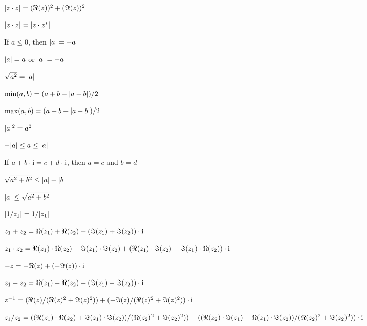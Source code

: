 \documentclass{article}
\begin{document}
\begin{thm}
\item\label{complex1:68} $\lvert z\cdot z\rvert=(\Re(z))^{2}+(\Im(z))^{2}$
\item\label{complex1:69} $\lvert z\cdot z\rvert=\lvert z\cdot z^{*}\rvert$
\item\label{complex1:70} If $a\leq0$, then $\lvert a\rvert=-a$
\item\label{complex1:71} $\lvert a\rvert=a$ or $\lvert a\rvert=-a$
\item\label{complex1:72} $\sqrt{a^{2}}=\lvert a\rvert$
\item\label{complex1:73} $\min(a,b)=(a+b-\lvert a-b\rvert)/2$
\item\label{complex1:74} $\max(a,b)=(a+b+\lvert a-b\rvert)/2$
\item\label{complex1:75} $\lvert a\rvert^{2}=a^{2}$
\item\label{complex1:76} $-\lvert a\rvert\leq a\leq\lvert a\rvert$
\item\label{complex1:77} If $a+b\cdot\mathrm{i}=c+d\cdot\mathrm{i}$, then $a=c$ and $b=d$
\item\label{complex1:78} $\sqrt{a^{2}+b^{2}}\leq\lvert a\rvert+\lvert b\rvert$
\item\label{complex1:79} $\lvert a\rvert\leq\sqrt{a^{2}+b^{2}}$
\item\label{complex1:80} $\lvert1/z_{1}\rvert=1/\lvert z_{1}\rvert$
\item\label{complex1:81} $z_{1}+z_{2}=\Re(z_{1})+\Re(z_{2})+(\Im(z_{1})+\Im(z_{2}))\cdot\mathrm{i}$
\item\label{complex1:82} $z_{1}\cdot z_{2}=\Re(z_{1})\cdot\Re(z_{2})-\Im(z_{1})\cdot\Im(z_{2})+(\Re(z_{1})\cdot\Im(z_{2})+\Im(z_{1})\cdot\Re(z_{2}))\cdot\mathrm{i}$
\item\label{complex1:83} $-z=-\Re(z)+(-\Im(z))\cdot\mathrm{i}$
\item\label{complex1:84} $z_{1}-z_{2}=\Re(z_{1})-\Re(z_{2})+(\Im(z_{1})-\Im(z_{2}))\cdot\mathrm{i}$
\item\label{complex1:85} $z^{-1}=(\Re(z)/(\Re(z)^{2}+\Im(z)^{2}))+(-\Im(z)/(\Re(z)^{2}+\Im(z)^{2}))\cdot\mathrm{i}$
\item\label{complex1:86} $z_{1}/z_{2}=((\Re(z_{1})\cdot\Re(z_{2})+\Im(z_{1})\cdot\Im(z_{2}))/(\Re(z_{2})^{2}+\Im(z_{2})^{2})) + ((\Re(z_{2})\cdot\Im(z_{1})-\Re(z_{1})\cdot\Im(z_{2}))/(\Re(z_{2})^{2}+\Im(z_{2})^{2}))\cdot\mathrm{i}$
\end{thm}
\end{document}
